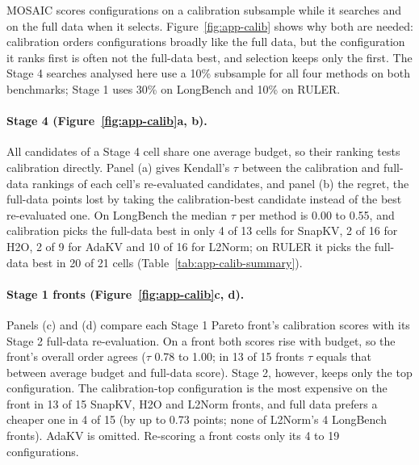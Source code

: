 MOSAIC scores configurations on a calibration subsample while it searches and on the full data when it selects. Figure~\ref{fig:app-calib} shows why both are needed: calibration orders configurations broadly like the full data, but the configuration it ranks first is often not the full-data best, and selection keeps only the first. The Stage 4 searches analysed here use a 10\% subsample for all four methods on both benchmarks; Stage 1 uses 30\% on LongBench and 10\% on RULER.

\paragraph{Stage 4 (Figure~\ref{fig:app-calib}a, b).} All candidates of a Stage 4 cell share one average budget, so their ranking tests calibration directly. Panel (a) gives Kendall's $\tau$ between the calibration and full-data rankings of each cell's re-evaluated candidates, and panel (b) the regret, the full-data points lost by taking the calibration-best candidate instead of the best re-evaluated one. On LongBench the median $\tau$ per method is 0.00 to 0.55, and calibration picks the full-data best in only 4 of 13 cells for SnapKV, 2 of 16 for H2O, 2 of 9 for AdaKV and 10 of 16 for L2Norm; on RULER it picks the full-data best in 20 of 21 cells (Table~\ref{tab:app-calib-summary}).

\paragraph{Stage 1 fronts (Figure~\ref{fig:app-calib}c, d).} Panels (c) and (d) compare each Stage 1 Pareto front's calibration scores with its Stage 2 full-data re-evaluation. On a front both scores rise with budget, so the front's overall order agrees ($\tau$ 0.78 to 1.00; in 13 of 15 fronts $\tau$ equals that between average budget and full-data score). Stage 2, however, keeps only the top configuration. The calibration-top configuration is the most expensive on the front in 13 of 15 SnapKV, H2O and L2Norm fronts, and full data prefers a cheaper one in 4 of 15 (by up to 0.73 points; none of L2Norm's 4 LongBench fronts). AdaKV is omitted. Re-scoring a front costs only its 4 to 19 configurations.



\begin{table}[!htbp]
  \centering
  \footnotesize\setlength{\tabcolsep}{2.5pt}
  
  \caption{\textbf{Stage 4 calibration (10\% subset) vs.\ full-data scores, summary.} Cells: (task, budget) pairs. Gap: mean calibration minus full-data score. $\tau$: mean Kendall correlation between the two rankings of each cell's re-evaluated configurations. Picks: cells where the calibration-best candidate is also full-data best. Regret: mean full-data points lost by trusting calibration.}
  \label{tab:app-calib-summary}
\end{table}

